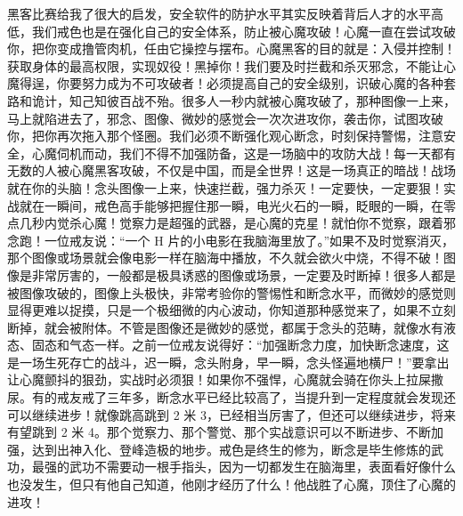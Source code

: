 黑客比赛给我了很大的启发，安全软件的防护水平其实反映着背后人才的水平高低，我们戒色也是在强化自己的安全体系，防止被心魔攻破！心魔一直在尝试攻破你，把你变成撸管肉机，任由它操控与摆布。心魔黑客的目的就是：入侵并控制！获取身体的最高权限，实现奴役！黑掉你！我们要及时拦截和杀灭邪念，不能让心魔得逞，你要努力成为不可攻破者！必须提高自己的安全级别，识破心魔的各种套路和诡计，知己知彼百战不殆。很多人一秒内就被心魔攻破了，那种图像一上来，马上就陷进去了，邪念、图像、微妙的感觉会一次次进攻你，袭击你，试图攻破你，把你再次拖入那个怪圈。我们必须不断强化观心断念，时刻保持警惕，注意安全，心魔伺机而动，我们不得不加强防备，这是一场脑中的攻防大战！每一天都有无数的人被心魔黑客攻破，不仅是中国，而是全世界！这是一场真正的暗战！战场就在你的头脑！念头图像一上来，快速拦截，强力杀灭！一定要快，一定要狠！实战就在一瞬间，戒色高手能够把握住那一瞬，电光火石的一瞬，眨眼的一瞬，在零点几秒内觉杀心魔！觉察力是超强的武器，是心魔的克星！就怕你不觉察，跟着邪念跑！一位戒友说：“一个 H 片的小电影在我脑海里放了。”如果不及时觉察消灭，那个图像或场景就会像电影一样在脑海中播放，不久就会欲火中烧，不得不破！图像是非常厉害的，一般都是极具诱惑的图像或场景，一定要及时断掉！很多人都是被图像攻破的，图像上头极快，非常考验你的警惕性和断念水平，而微妙的感觉则显得更难以捉摸，只是一个极细微的内心波动，你知道那种感觉来了，如果不立刻断掉，就会被附体。不管是图像还是微妙的感觉，都属于念头的范畴，就像水有液态、固态和气态一样。之前一位戒友说得好：“加强断念力度，加快断念速度，这是一场生死存亡的战斗，迟一瞬，念头附身，早一瞬，念头怪遍地横尸！”要拿出让心魔颤抖的狠劲，实战时必须狠！如果你不强悍，心魔就会骑在你头上拉屎撒尿。有的戒友戒了三年多，断念水平已经比较高了，当提升到一定程度就会发现还可以继续进步！就像跳高跳到 2 米 3，已经相当厉害了，但还可以继续进步，将来有望跳到 2 米 4。那个觉察力、那个警觉、那个实战意识可以不断进步、不断加强，达到出神入化、登峰造极的地步。戒色是终生的修为，断念是毕生修炼的武功，最强的武功不需要动一根手指头，因为一切都发生在脑海里，表面看好像什么也没发生，但只有他自己知道，他刚才经历了什么！他战胜了心魔，顶住了心魔的进攻！

